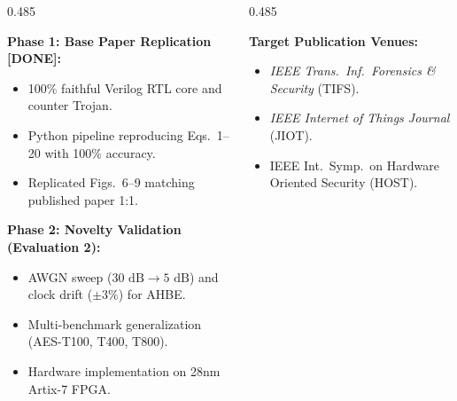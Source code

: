 \documentclass[aspectratio=169,11pt]{beamer}
\begin{document}
\begin{frame}[t]
  \vspace*{-0.18cm}

  \begin{columns}[T, onlytextwidth]
    \begin{column}{0.485\textwidth}
      \begin{glassbox}[top=2pt, bottom=2pt, left=6pt, right=6pt, title={Completed vs.\ Planned Milestones}]{}
        \textbf{Phase 1: Base Paper Replication [DONE]:}
        \begin{itemize}\setlength{\itemsep}{1pt}
          \item[$\checkmark$] 100\% faithful Verilog RTL core and counter Trojan.
          \item[$\checkmark$] Python pipeline reproducing Eqs.\ 1--20 with 100\% accuracy.
          \item[$\checkmark$] Replicated Figs.\ 6--9 matching published paper 1:1.
        \end{itemize}
        \vspace{1.5pt}

        \textbf{Phase 2: Novelty Validation (Evaluation 2):}
        \begin{itemize}\setlength{\itemsep}{1pt}
          \item[$\square$] AWGN sweep ($30\text{ dB} \to 5\text{ dB}$) and clock drift ($\pm 3\%$) for AHBE.
          \item[$\square$] Multi-benchmark generalization (AES-T100, T400, T800).
          \item[$\square$] Hardware implementation on 28nm Artix-7 FPGA.
        \end{itemize}
      \end{glassbox}
    \end{column}

    \begin{column}{0.485\textwidth}
      \begin{glassbox}[top=2pt, bottom=2pt, left=6pt, right=6pt, title={Publication \& Defense Trajectory}]{}
        \textbf{Target Publication Venues:}
        \begin{itemize}\setlength{\itemsep}{1pt}
          \item \textit{IEEE Trans.\ Inf.\ Forensics \& Security} (TIFS).
          \item \textit{IEEE Internet of Things Journal} (JIOT).
          \item IEEE Int.\ Symp.\ on Hardware Oriented Security (HOST).
        \end{itemize}
        \vspace{1.5pt}


\end{glassbox}
\end{column}
\end{columns}
\end{frame}
\end{document}
